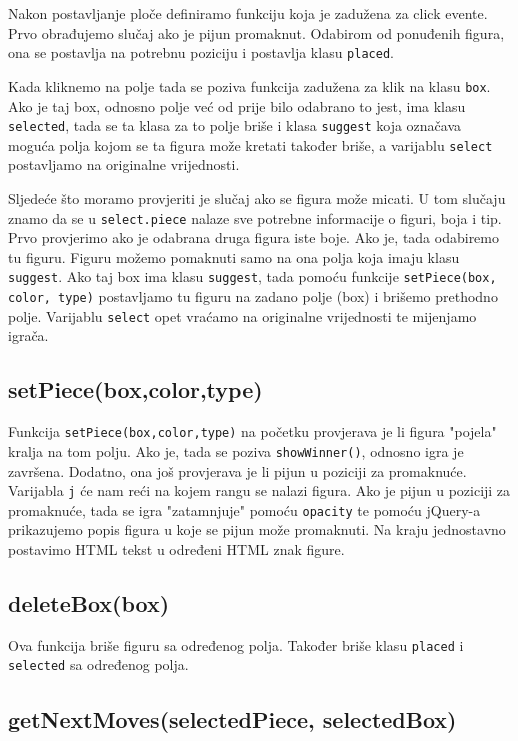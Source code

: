 \documentclass{article}
\begin{document}
Nakon postavljanje ploče definiramo funkciju koja je zadužena za click evente. Prvo obrađujemo slučaj ako je pijun promaknut. Odabirom od ponuđenih figura, ona se postavlja na potrebnu poziciju i postavlja klasu \verb|placed|.

Kada kliknemo na polje tada se poziva funkcija zadužena za klik na klasu \verb|box|. Ako je taj box, odnosno polje već od prije bilo odabrano to jest, ima klasu \verb|selected|, tada se ta klasa za to polje briše i klasa \verb|suggest| koja označava moguća polja kojom se ta figura može kretati također briše, a varijablu \verb|select| postavljamo na originalne vrijednosti.

Sljedeće što moramo provjeriti je slučaj ako se figura može micati. U tom slučaju znamo da se u \verb|select.piece| nalaze sve potrebne informacije o figuri, boja i tip. Prvo provjerimo ako je odabrana druga figura iste boje. Ako je, tada odabiremo tu figuru. Figuru možemo pomaknuti samo na ona polja koja imaju klasu \verb|suggest|. Ako taj box ima klasu \verb|suggest|, tada pomoću funkcije \verb|setPiece(box, color, type)| postavljamo tu figuru na zadano polje (box) i brišemo prethodno polje. Varijablu \verb|select| opet vraćamo na originalne vrijednosti te mijenjamo igrača.





\subsection{setPiece(box,color,type)}
Funkcija \verb|setPiece(box,color,type)| na početku provjerava je li figura "pojela" kralja na tom polju. Ako je, tada se poziva \verb|showWinner()|, odnosno igra je završena. Dodatno, ona još provjerava je li pijun u poziciji za promaknuće. Varijabla \verb|j| će nam reći na kojem rangu se nalazi figura. Ako je pijun u poziciji za promaknuće, tada se igra "zatamnjuje" pomoću \verb|opacity| te pomoću jQuery-a prikazujemo popis figura u koje se pijun može promaknuti. Na kraju jednostavno postavimo HTML tekst u određeni HTML znak figure.

\subsection{deleteBox(box)}

Ova funkcija briše figuru sa određenog polja. Također briše klasu \verb|placed| i \verb|selected| sa određenog polja.

\subsection{getNextMoves(selectedPiece, selectedBox)}
\end{document}
